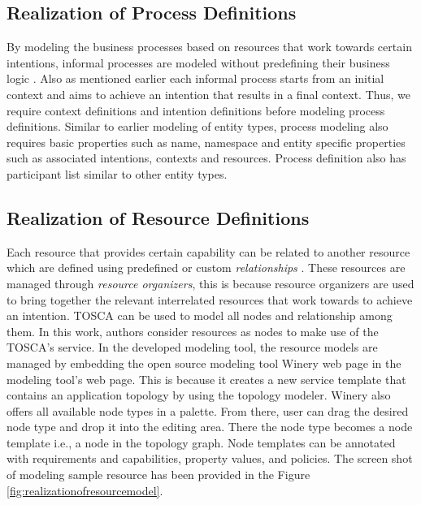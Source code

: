 \subsection{Realization of Process Definitions}
By modeling the business processes based on resources that work towards certain intentions, informal processes are modeled without predefining their business logic \cite{Sungur2014a}. Also as mentioned earlier each informal process starts from an initial context and aims to achieve an intention that results in a final context. Thus, we require context definitions and intention definitions before modeling process definitions. Similar to earlier modeling of entity types, process modeling also requires basic properties such as name, namespace  and entity specific properties such as associated intentions, contexts and resources. Process definition also has participant list similar to other entity types. 

\subsection{Realization of Resource Definitions}
Each resource that provides certain capability can be related to another resource which are defined using predefined or custom \textit{relationships} \cite{Sungur2014a}. These resources are managed through \textit{resource organizers}, this is because resource organizers are used to bring together the relevant interrelated resources that work towards to achieve an intention. TOSCA \cite{Binz2014} can be used to model all nodes and relationship among them. In this work, authors consider resources as nodes to make use of the TOSCA's service. In the developed modeling tool, the resource models are managed by embedding the open source modeling tool Winery web page \cite{Kopp2013} in the modeling tool's web page. This is because it creates a new service template that contains an application topology by using the topology modeler. Winery also offers all available node types in a palette. From there, user can drag the desired node type and drop it into the editing area. There the node type becomes a node template i.e., a node in the topology graph. Node templates can be annotated with requirements and capabilities, property values, and policies. The screen shot of modeling sample resource has been provided in the Figure \ref{fig:realizationofresourcemodel}. 

